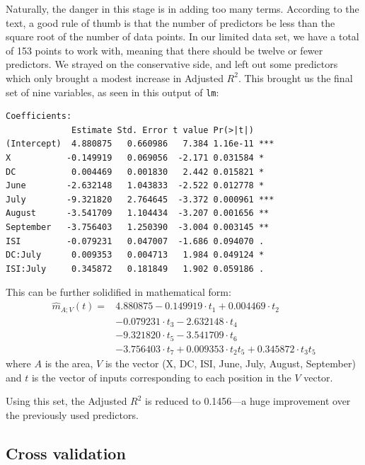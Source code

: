 \documentclass{article}
\begin{document}
Naturally, the danger in this stage is in adding too many terms. According to
the text, a good rule of thumb is that the number of predictors be less than
the square root of the number of data points. In our limited data set, we have
a total of 153 points to work with, meaning that there should be twelve or
fewer predictors. We strayed on the conservative side, and left out some
predictors which only brought a modest increase in Adjusted $R^2$. This brought
us the final set of nine variables, as seen in this output of \verb=lm=:

\begin{verbatim}
Coefficients:
             Estimate Std. Error t value Pr(>|t|)    
(Intercept)  4.880875   0.660986   7.384 1.16e-11 ***
X           -0.149919   0.069056  -2.171 0.031584 *  
DC           0.004469   0.001830   2.442 0.015821 *  
June        -2.632148   1.043833  -2.522 0.012778 *  
July        -9.321820   2.764645  -3.372 0.000961 ***
August      -3.541709   1.104434  -3.207 0.001656 ** 
September   -3.756403   1.250390  -3.004 0.003145 ** 
ISI         -0.079231   0.047007  -1.686 0.094070 .  
DC:July      0.009353   0.004713   1.984 0.049124 *  
ISI:July     0.345872   0.181849   1.902 0.059186 .  
\end{verbatim}

This can be further solidified in mathematical form:
\begin{align*}
  \widehat{m}_{A;V}(t) = &4.880875 - 0.149919 \cdot t_1 + 0.004469 \cdot t_2 \\
                         &- 0.079231 \cdot t_3 - 2.632148 \cdot t_4 \\
                         &- 9.321820 \cdot t_5 - 3.541709\cdot t_6 \\
                         &- 3.756403\cdot t_7 + 0.009353\cdot t_2 t_5 
                         + 0.345872\cdot t_3 t_5
\end{align*}
where $A$ is the area, $V$ is the vector (X, DC, ISI, June, July, August, 
September) and $t$ is the vector of inputs corresponding to each position in 
the $V$ vector.

Using this set, the Adjusted $R^2$ is reduced to 0.1456---a huge improvement
over the previously used predictors.

\subsection{Cross validation}
\end{document}
